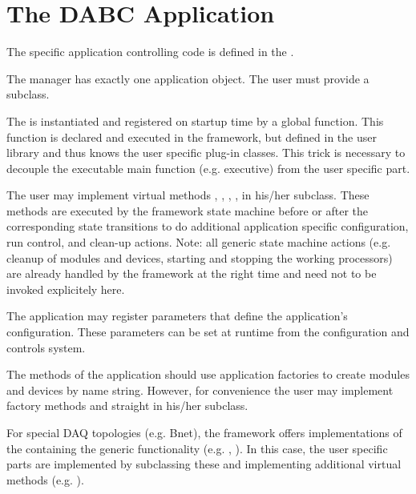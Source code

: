 \section{The DABC Application}
The specific application controlling code is defined in 
   the .   
\begin{compactenum}
\item  The manager has exactly one application object. 
      The user must provide a  subclass.
\item  The  is instantiated and registered on 
      startup time by a global  function. This function 
      is declared and executed in the framework, but defined in the user 
      library and thus knows the user specific plug-in classes. 
      This trick is necessary to decouple the executable main function 
      (e.g. \xdaq executive) from the user specific part.  
\item  The user may implement virtual methods  ,  
      , , 
      ,  in his/her 
       subclass. These methods are executed by the 
      framework state machine before or after the corresponding state 
      transitions to do additional application specific configuration, 
      run control, and clean-up actions. Note: all generic state machine 
      actions (e.g. cleanup of modules and devices, starting 
      and stopping the working processors) are already handled by 
      the framework at the right time and need not to be invoked explicitely here.
\item  The application  may register parameters that 
      define the application's configuration. These parameters can be set at 
      runtime from the configuration and controls system.
\item  The methods of the application  should use 
      application factories to create modules and 
      devices by name string. However, for convenience the user may 
      implement factory methods  and  straight 
      in his/her  subclass.
\item   For special DAQ topologies (e.g. Bnet), the framework offers 
      implementations of the  containing the 
      generic functionality (e.g. , ). 
      In this case, the user specific parts are implemented by subclassing 
      these and implementing additional virtual methods (e.g. ).    
\end{compactenum}






